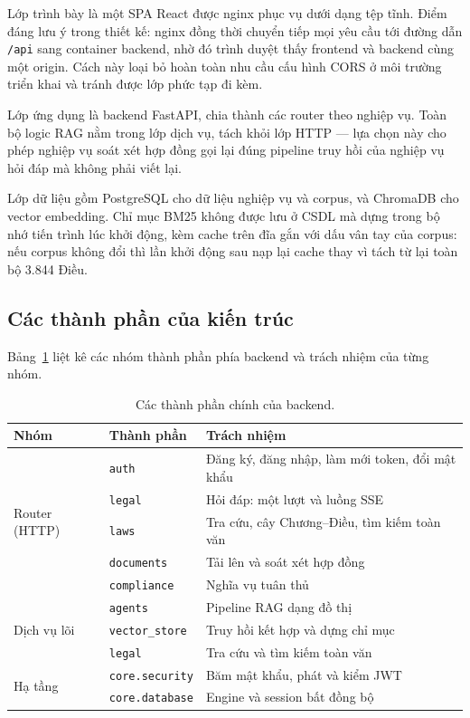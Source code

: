 \documentclass[12pt,a4paper]{report}
\numberwithin{equation}{chapter}
\numberwithin{figure}{chapter}
\numberwithin{table}{chapter}
\newcommand{\soDieu}{3.844}
\begin{document}
Lớp trình bày là một SPA React được nginx phục vụ dưới dạng tệp tĩnh. Điểm đáng
lưu ý trong thiết kế: nginx đồng thời chuyển tiếp mọi yêu cầu tới đường dẫn
\texttt{/api} sang container backend, nhờ đó trình duyệt thấy frontend và backend
cùng một origin. Cách này loại bỏ hoàn toàn nhu cầu cấu hình CORS ở môi trường
triển khai và tránh được lớp phức tạp đi kèm.

Lớp ứng dụng là backend FastAPI, chia thành các router theo nghiệp vụ. Toàn bộ
logic RAG nằm trong lớp dịch vụ, tách khỏi lớp HTTP --- lựa chọn này cho phép
nghiệp vụ soát xét hợp đồng gọi lại đúng pipeline truy hồi của nghiệp vụ hỏi đáp
mà không phải viết lại.

Lớp dữ liệu gồm PostgreSQL cho dữ liệu nghiệp vụ và corpus, và ChromaDB cho
vector embedding. Chỉ mục BM25 không được lưu ở CSDL mà dựng trong bộ nhớ tiến
trình lúc khởi động, kèm cache trên đĩa gắn với dấu vân tay của corpus: nếu corpus
không đổi thì lần khởi động sau nạp lại cache thay vì tách từ lại toàn bộ
\soDieu{} Điều.

\subsection{Các thành phần của kiến trúc}

Bảng~\ref{tab:thanh-phan} liệt kê các nhóm thành phần phía backend và trách nhiệm
của từng nhóm.

\begin{table}[htp]
    \centering
    \caption{Các thành phần chính của backend.}
    \label{tab:thanh-phan}
    \begin{tabular}{p{3.6cm}p{4.0cm}p{6.2cm}}
        \toprule
        \textbf{Nhóm} & \textbf{Thành phần} & \textbf{Trách nhiệm} \\
        \midrule
        \multirow{5}{*}{Router (HTTP)}
          & \texttt{auth} & Đăng ký, đăng nhập, làm mới token, đổi mật khẩu \\
          & \texttt{legal} & Hỏi đáp: một lượt và luồng SSE \\
          & \texttt{laws} & Tra cứu, cây Chương--Điều, tìm kiếm toàn văn \\
          & \texttt{documents} & Tải lên và soát xét hợp đồng \\
          & \texttt{compliance} & Nghĩa vụ tuân thủ \\
        \midrule
        \multirow{3}{*}{Dịch vụ lõi}
          & \texttt{agents} & Pipeline RAG dạng đồ thị \\
          & \texttt{vector\_store} & Truy hồi kết hợp và dựng chỉ mục \\
          & \texttt{legal} & Tra cứu và tìm kiếm toàn văn \\
        \midrule
        \multirow{2}{*}{Hạ tầng}
          & \texttt{core.security} & Băm mật khẩu, phát và kiểm JWT \\
          & \texttt{core.database} & Engine và session bất đồng bộ \\
        \bottomrule
    \end{tabular}
\end{table}
\end{document}
